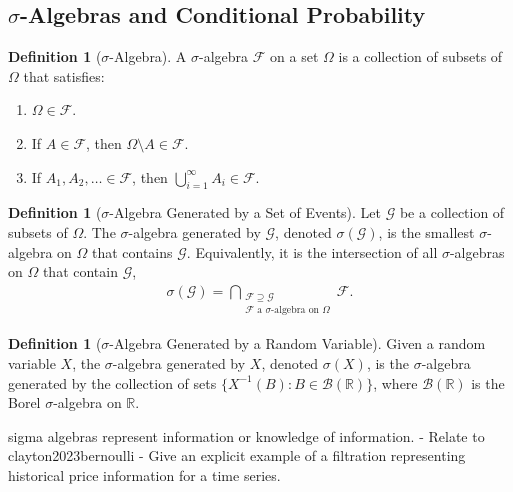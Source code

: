 \documentclass[11pt,reqno]{amsart}
\theoremstyle{definition}
\newtheorem{definition}[theorem]{Definition}
\theoremstyle{remark}
\begin{document}
\subsection{\(\sigma\)-Algebras and Conditional Probability}

\begin{definition}[\(\sigma\)-Algebra]
	A \(\sigma\)-algebra \(\mathcal{F}\) on a set \(\Omega\) is a collection of subsets of \(\Omega\) that satisfies:
	\begin{enumerate}[label=(\roman*)]
		\item \(\Omega \in \mathcal{F}\).
		\item If \(A \in \mathcal{F}\), then \(\Omega \setminus A \in \mathcal{F}\).
		\item If \(A_1, A_2, \ldots \in \mathcal{F}\), then \(\bigcup_{i=1}^\infty A_i \in \mathcal{F}\).
	\end{enumerate}
\end{definition}

\begin{definition}[\(\sigma\)-Algebra Generated by a Set of Events]
	Let \(\mathcal{G}\) be a collection of subsets of \(\Omega\).
	The \(\sigma\)-algebra generated by \(\mathcal{G}\), denoted \(\sigma(\mathcal{G})\), is the smallest \(\sigma\)-algebra on \(\Omega\) that contains \(\mathcal{G}\).
	Equivalently, it is the intersection of all \(\sigma\)-algebras on \(\Omega\) that contain \(\mathcal{G}\),
	\begin{align*}
		\sigma(\mathcal{G}) = \bigcap_{\substack{\mathcal{F} \supseteq \mathcal{G} \\\mathcal{F}\text{ a }\sigma\text{-algebra} \text{ on }\Omega}} \mathcal{F}.
	\end{align*}
\end{definition}

\begin{definition}[\(\sigma\)-Algebra Generated by a Random Variable]
	Given a random variable $X$, the \(\sigma\)-algebra generated by $X$, denoted \(\sigma(X)\), is the \(\sigma\)-algebra generated by the collection of sets \( \{X^{-1}(B) : B \in \mathcal{B}(\mathbb{R})\} \), where \(\mathcal{B}(\mathbb{R})\) is the Borel \(\sigma\)-algebra on \(\mathbb{R}\).
\end{definition}

sigma algebras represent information or knowledge of information.
- Relate to clayton2023bernoulli
- Give an explicit example of a filtration representing historical price information for a time series.
\end{document}

